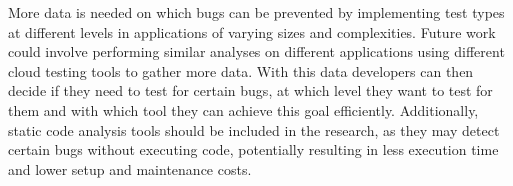 \documentclass[conference]{IEEEtran}
\begin{document}
\newline
More data is needed on which bugs can be prevented by implementing test types at different levels in applications of varying sizes and complexities.
Future work could involve performing similar analyses on different applications using different cloud testing tools to gather more data.
With this data developers can then decide if they need to test for certain bugs, at which level they want to test
for them and with which tool they can achieve this goal efficiently.
Additionally, static code analysis tools should be included in the research, as they may detect certain bugs without executing code,
potentially resulting in less execution time and lower setup and maintenance costs.




\date{\today}



\newpage
%
\end{document}
